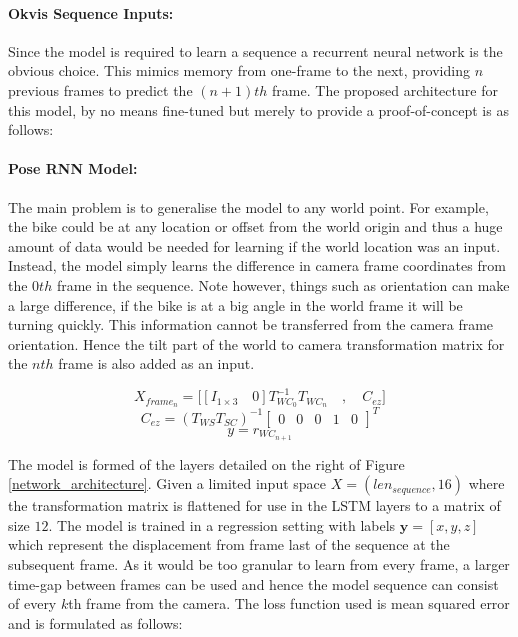 \documentclass[11pt,twoside]{report}
\begin{document}
\paragraph{Okvis Sequence Inputs:}
Since the model is required to learn a sequence a recurrent neural network is the obvious choice. This mimics memory from one-frame to the next, providing $n$ previous frames to predict the $(n+1)th$ frame. The proposed architecture for this model, by no means fine-tuned but merely to provide a proof-of-concept is as follows:

\paragraph{Pose RNN Model:} \label{pose_model}
The main problem is to generalise the model to any world point. For example, the bike could be at any location or offset from the world origin and thus a huge amount of data would be needed for learning if the world location was an input. Instead, the model simply learns the difference in camera frame coordinates from the $0th$ frame in the sequence. Note however, things such as orientation can make a large difference, if the bike is at a big angle in the world frame it will be turning quickly. This information cannot be transferred from the camera frame orientation. Hence the tilt part of the world to camera transformation matrix for the $nth$ frame is also added as an input.


\begin{equation}
X_{frame_{n}} = 
\bigg [ [I_{1 \times 3} \quad 0]T^{-1}_{WC_{0}}T_{WC_{n}} \quad , \quad C_{ez}\bigg ]
\end{equation}
\begin{equation}
C_{ez} = (T_{WS} T_{SC})^{-1}
\begin{bmatrix}
0 & 0 & 0 & 1 & 0
\end{bmatrix}^{T}
\end{equation}
\begin{equation}
y = r_{WC_{n+1}}
\label{pose_sequence}
\end{equation}

The model is formed of the layers detailed on the right of Figure \ref{network_architecture}. Given a limited input space $X = (len_{sequence}, 16)$ where the transformation matrix is flattened for use in the LSTM layers to a matrix of size $12$. The model is trained in a regression setting with labels $\mathbf{y}=[x,y,z]$ which represent the displacement from frame last of the sequence at the subsequent frame. As it would be too granular to learn from every frame, a larger time-gap between frames can be used and hence the model sequence can consist of every $k$th frame from the camera. The loss function used is mean squared error and is formulated as follows:
\end{document}
